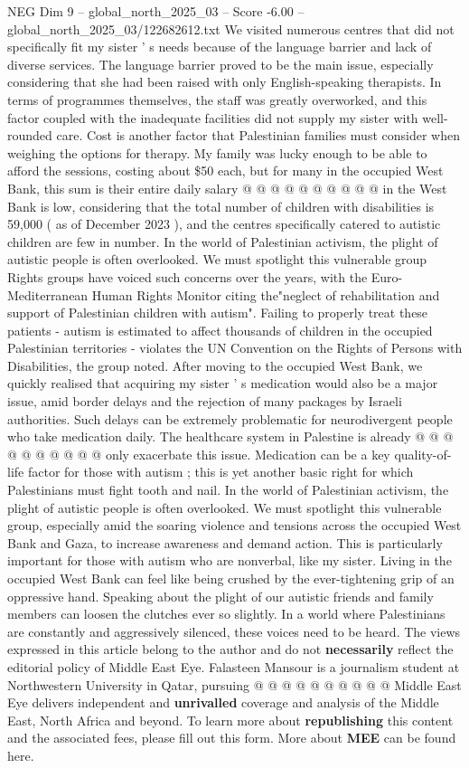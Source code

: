 \begin{textsample}{NEG Dim 9 – global\_north\_2025\_03 – Score -6.00 – global\_north\_2025\_03/122682612.txt}
We visited numerous centres that did not specifically fit my sister ' s needs because of the language barrier and lack of diverse services.
The language barrier proved to be the main issue, especially considering that she had been raised with only English-speaking therapists.
In terms of programmes themselves, the staff was greatly overworked, and this factor coupled with the inadequate facilities did not supply my sister with well-rounded care.
Cost is another factor that Palestinian families must consider when weighing the options for therapy.
My family was lucky enough to be able to afford the sessions, costing about \$50 each, but for many in the occupied West Bank, this sum is their entire daily salary @ @ @ @ @ @ @ @ @ @ in the West Bank is low, considering that the total number of children with disabilities is 59,000 ( as of December 2023 ), and the centres specifically catered to autistic children are few in number.
In the world of Palestinian activism, the plight of autistic people is often overlooked.
We must spotlight this vulnerable group Rights groups have voiced such concerns over the years, with the Euro-Mediterranean Human Rights Monitor citing the"neglect of rehabilitation and support of Palestinian children with autism".
Failing to properly treat these patients - autism is estimated to affect thousands of children in the occupied Palestinian territories - violates the UN Convention on the Rights of Persons with Disabilities, the group noted.
After moving to the occupied West Bank, we quickly realised that acquiring my sister ' s medication would also be a major issue, amid border delays and the rejection of many packages by Israeli authorities.
Such delays can be extremely problematic for neurodivergent people who take medication daily.
The healthcare system in Palestine is already @ @ @ @ @ @ @ @ @ @ only exacerbate this issue.
Medication can be a key quality-of-life factor for those with autism ; this is yet another basic right for which Palestinians must fight tooth and nail.
In the world of Palestinian activism, the plight of autistic people is often overlooked.
We must spotlight this vulnerable group, especially amid the soaring violence and tensions across the occupied West Bank and Gaza, to increase awareness and demand action.
This is particularly important for those with autism who are nonverbal, like my sister.
Living in the occupied West Bank can feel like being crushed by the ever-tightening grip of an oppressive hand.
Speaking about the plight of our autistic friends and family members can loosen the clutches ever so slightly.
In a world where Palestinians are constantly and aggressively silenced, these voices need to be heard.
The views expressed in this article belong to the author and do not \textbf{necessarily} reflect the editorial policy of Middle East Eye.
Falasteen Mansour is a journalism student at Northwestern University in Qatar, pursuing @ @ @ @ @ @ @ @ @ @ Middle East Eye delivers independent and \textbf{unrivalled} coverage and analysis of the Middle East, North Africa and beyond.
To learn more about \textbf{republishing} this content and the associated fees, please fill out this form.
More about \textbf{MEE} can be found here.


\end{textsample}
